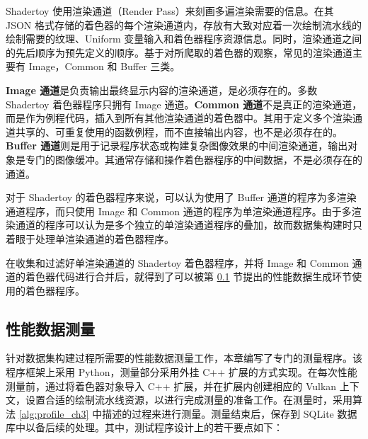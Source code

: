 Shadertoy 使用渲染通道（Render Pass）来刻画多遍渲染需要的信息。在其 JSON 格式存储的着色器的每个渲染通道内，存放有大致对应着一次绘制流水线的绘制需要的纹理、Uniform 变量输入和着色器程序资源信息。同时，渲染通道之间的先后顺序为预先定义的顺序。基于对所爬取的着色器的观察，常见的渲染通道主要有 Image，Common 和 Buffer 三类。

{\bf Image 通道}是负责输出最终显示内容的渲染通道，是必须存在的。多数 Shadertoy 着色器程序只拥有 Image 通道。{\bf Common 通道}不是真正的渲染通道，而是作为例程代码，插入到所有其他渲染通道的着色器中。其用于定义多个渲染通道共享的、可重复使用的函数例程，而不直接输出内容，也不是必须存在的。{\bf Buffer 通道}则是用于记录程序状态或构建复杂图像效果的中间渲染通道，输出对象是专门的图像缓冲。其通常存储和操作着色器程序的中间数据，不是必须存在的通道。

对于 Shadertoy 的着色器程序来说，可以认为使用了 Buffer 通道的程序为多渲染通道程序，而只使用 Image 和 Common 通道的程序为单渲染通道程序。由于多渲染通道的程序可以认为是多个独立的单渲染通道程序的叠加，故而{\amend 数据集构建}时只着眼于处理单渲染通道的着色器程序。

{\amend 在收集和过滤好单渲染通道的 Shadertoy 着色器程序，并将 Image 和 Common 通道的着色器代码进行合并后，就得到了可以被第 \ref{sec:perf_data_generation} 节提出的性能数据生成环节使用的着色器程序。}

\subsection{性能数据测量}
\label{sec:perf_data_generation}

{\amend 针对数据集构建过程所需要的性能数据测量工作，本章编写了专门的测量程序。该程序框架上采用 Python，测量部分采用外挂 C++ 扩展的方式实现。在每次性能测量前，通过将着色器对象导入 C++ 扩展，并在扩展内创建相应的 Vulkan 上下文，设置合适的绘制流水线资源，以进行完成测量的准备工作。在测量时，采用算法 \ref{alg:profile_ch3} 中描述的过程来进行测量。测量结束后，保存到 SQLite 数据库中以备后续的处理。其中，测试程序设计上的若干要点如下：}

